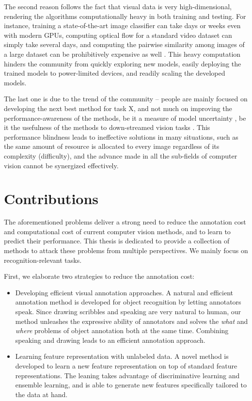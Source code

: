 The second reason follows the fact that visual data is very high-dimensional,  rendering the algorithms computationally heavy in both training and testing. For instance, training a state-of-the-art image classifier \citep{vgg16, ResNet} can take days or weeks even with modern GPUs,  computing optical flow for a standard video dataset \citep{large:video:cnn} can simply take several days,  and computing the pairwise similarity among images of a large dataset can be prohibitively expensive as well \citep{Gong_2013_CVPR}. This heavy computation hinders the community from quickly exploring new models,  easily deploying the trained models to power-limited devices, and readily scaling the developed models. 

The last one is due to the trend of the community -- people are mainly focused on developing the next best method for task X, and not much on improving the performance-awareness of the methods, be it  a measure of model uncertainty \citep{kendall2015bayesian, confidence:of:08},  be it the usefulness of the methods to down-streamed vision tasks \citep{can-similar-scene-help, eth_biwi_00883,  15000object}. This performance blindness leads to ineffective solutions in many situations, such as the same amount of resource is allocated to every image regardless of its complexity (difficulty), and the advance made in all the sub-fields of computer vision cannot be synergized effectively.  

\section{Contributions}
The aforementioned problems deliver a strong need to reduce the annotation cost and computational cost of current computer vision methods, and to learn to predict their performance.  This thesis is dedicated to provide a collection of methods to attack these problems from multiple perspectives. We mainly focus on recognition-relevant  tasks.  

First, we elaborate two strategies to reduce the annotation cost: 
\begin{itemize}
\item  Developing efficient visual annotation approaches.  A natural and efficient annotation method is developed for object recognition by letting annotators speak.  Since drawing scribbles and speaking are very natural to human,  our method unleashes the expressive ability of annotators and solves the \emph{what} and \emph{where} problems of object annotation both at the same time. 
Combining speaking and drawing leads to an efficient annotation approach.  

\item  Learning  feature representation with unlabeled data.  A novel method is developed to learn a new feature representation on top of standard feature representations.  The leaning takes advantage of discriminative learning and ensemble learning, and is able to generate new features specifically tailored to the data at hand.  
\end{itemize}

